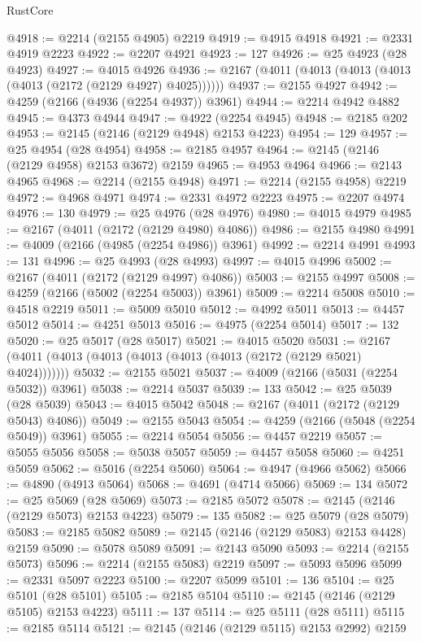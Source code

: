 \begin{lexlean}{RustCore}
\begin{coremodule}
@4918 := @2214 (@2155 @4905) @2219
@4919 := @4915 @4918
@4921 := @2331 @4919 @2223
@4922 := @2207 @4921
@4923 := 127
@4926 := @25 @4923 (@28 @4923)
@4927 := @4015 @4926
@4936 := @2167 (@4011 (@4013 (@4013 (@4013 (@4013 (@2172 (@2129 @4927) @4025))))))
@4937 := @2155 @4927
@4942 := @4259 (@2166 (@4936 (@2254 @4937)) @3961)
@4944 := @2214 @4942 @4882
@4945 := @4373 @4944
@4947 := @4922 (@2254 @4945)
@4948 := @2185 @202
@4953 := @2145 (@2146 (@2129 @4948) @2153 @4223)
@4954 := 129
@4957 := @25 @4954 (@28 @4954)
@4958 := @2185 @4957
@4964 := @2145 (@2146 (@2129 @4958) @2153 @3672) @2159
@4965 := @4953 @4964
@4966 := @2143 @4965
@4968 := @2214 (@2155 @4948)
@4971 := @2214 (@2155 @4958) @2219
@4972 := @4968 @4971
@4974 := @2331 @4972 @2223
@4975 := @2207 @4974
@4976 := 130
@4979 := @25 @4976 (@28 @4976)
@4980 := @4015 @4979
@4985 := @2167 (@4011 (@2172 (@2129 @4980) @4086))
@4986 := @2155 @4980
@4991 := @4009 (@2166 (@4985 (@2254 @4986)) @3961)
@4992 := @2214 @4991
@4993 := 131
@4996 := @25 @4993 (@28 @4993)
@4997 := @4015 @4996
@5002 := @2167 (@4011 (@2172 (@2129 @4997) @4086))
@5003 := @2155 @4997
@5008 := @4259 (@2166 (@5002 (@2254 @5003)) @3961)
@5009 := @2214 @5008
@5010 := @4518 @2219
@5011 := @5009 @5010
@5012 := @4992 @5011
@5013 := @4457 @5012
@5014 := @4251 @5013
@5016 := @4975 (@2254 @5014)
@5017 := 132
@5020 := @25 @5017 (@28 @5017)
@5021 := @4015 @5020
@5031 := @2167 (@4011 (@4013 (@4013 (@4013 (@4013 (@4013 (@2172 (@2129 @5021) @4024)))))))
@5032 := @2155 @5021
@5037 := @4009 (@2166 (@5031 (@2254 @5032)) @3961)
@5038 := @2214 @5037
@5039 := 133
@5042 := @25 @5039 (@28 @5039)
@5043 := @4015 @5042
@5048 := @2167 (@4011 (@2172 (@2129 @5043) @4086))
@5049 := @2155 @5043
@5054 := @4259 (@2166 (@5048 (@2254 @5049)) @3961)
@5055 := @2214 @5054
@5056 := @4457 @2219
@5057 := @5055 @5056
@5058 := @5038 @5057
@5059 := @4457 @5058
@5060 := @4251 @5059
@5062 := @5016 (@2254 @5060)
@5064 := @4947 (@4966 @5062)
@5066 := @4890 (@4913 @5064)
@5068 := @4691 (@4714 @5066)
@5069 := 134
@5072 := @25 @5069 (@28 @5069)
@5073 := @2185 @5072
@5078 := @2145 (@2146 (@2129 @5073) @2153 @4223)
@5079 := 135
@5082 := @25 @5079 (@28 @5079)
@5083 := @2185 @5082
@5089 := @2145 (@2146 (@2129 @5083) @2153 @4428) @2159
@5090 := @5078 @5089
@5091 := @2143 @5090
@5093 := @2214 (@2155 @5073)
@5096 := @2214 (@2155 @5083) @2219
@5097 := @5093 @5096
@5099 := @2331 @5097 @2223
@5100 := @2207 @5099
@5101 := 136
@5104 := @25 @5101 (@28 @5101)
@5105 := @2185 @5104
@5110 := @2145 (@2146 (@2129 @5105) @2153 @4223)
@5111 := 137
@5114 := @25 @5111 (@28 @5111)
@5115 := @2185 @5114
@5121 := @2145 (@2146 (@2129 @5115) @2153 @2992) @2159

\end{coremodule}
\end{lexlean}
